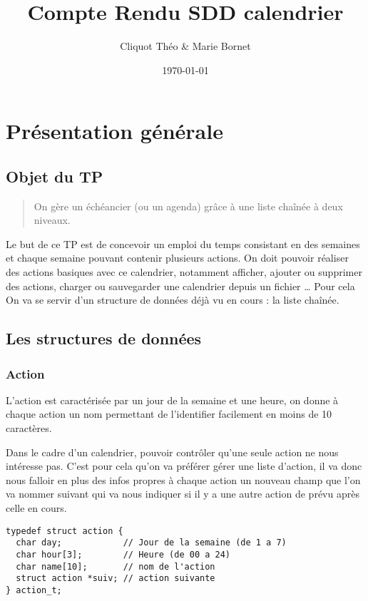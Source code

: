 \documentclass[11pt]{article}
\author{Cliquot Théo \& Marie Bornet}
\date{\today}
\title{Compte Rendu SDD calendrier}
\begin{document}
\maketitle
\tableofcontents


\section{Présentation générale}
\label{sec:orgb462cd5}

\subsection{Objet du TP}
\label{sec:orgfc3f46b}
\begin{quote}
On gère un échéancier (ou un agenda) grâce à une liste chaînée à deux niveaux.
\end{quote}

Le but de ce TP est de concevoir un emploi du temps consistant en des semaines
et chaque semaine pouvant contenir plusieurs actions. On doit pouvoir réaliser
des actions basiques avec ce calendrier, notamment afficher, ajouter ou
supprimer des actions, charger ou sauvegarder une calendrier depuis un fichier
\ldots{}
Pour cela On va se servir d'un structure de données déjà vu en cours : la
liste chaînée.


\subsection{Les structures de données}
\label{sec:orgdf632c5}

\subsubsection{Action}
\label{sec:org28a3004}

L'action est caractérisée par un jour de la semaine et une heure, on donne à
chaque action un nom permettant de l'identifier facilement en moins de 10
caractères.


Dans le cadre d'un calendrier, pouvoir contrôler qu'une seule action ne nous
intéresse pas. C'est pour cela qu'on va préférer gérer une liste d'action,
il va donc nous falloir en plus des infos propres à chaque action un nouveau
champ que l'on va nommer suivant qui va nous indiquer si il y a une autre
action de prévu après celle en cours.

\begin{lstlisting}
typedef struct action {
  char day;            // Jour de la semaine (de 1 a 7)
  char hour[3];        // Heure (de 00 a 24)
  char name[10];       // nom de l'action
  struct action *suiv; // action suivante
} action_t;
\end{lstlisting}
\end{document}
